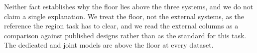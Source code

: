 Neither fact establishes why the floor lies above the three systems, and we do not claim a
single explanation. We treat the floor, not the external systems, as the reference the
region task has to clear, and we read the external columns as a comparison against
published designs rather than as the standard for this task. The dedicated and joint
models are above the floor at every dataset.
